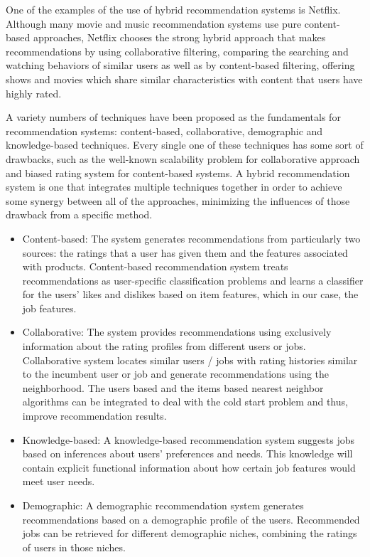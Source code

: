 \documentclass[sigconf]{acmart}
\begin{document}
\par One of the examples of the use of hybrid recommendation systems is Netflix. Although many movie and music recommendation systems use pure content-based approaches, Netflix chooses the strong hybrid approach that makes recommendations by using collaborative filtering, comparing the searching and watching behaviors of similar users as well as by content-based filtering, offering shows and movies which share similar characteristics with content that users have highly rated.

\par A variety numbers of techniques have been proposed as the fundamentals for recommendation systems: content-based, collaborative, demographic and knowledge-based techniques. Every single one of these techniques has some sort of drawbacks, such as the well-known scalability problem for collaborative approach and biased rating system for content-based systems. A hybrid recommendation system is one that integrates multiple techniques together in order to achieve some synergy between all of the approaches, minimizing the influences of those drawback from a specific method.

\begin{itemize}
  \item Content-based: The system generates recommendations from particularly two sources: the ratings that a user has given them and the features associated with products. Content-based recommendation system treats recommendations as user-specific classification problems and learns a classifier for the users' likes and dislikes based on item features, which in our case, the job features.
  \item Collaborative: The system provides recommendations using exclusively information about the rating profiles from different users or jobs. Collaborative system locates similar users / jobs with rating histories similar to the incumbent user or job and generate recommendations using the neighborhood. The users based and the items based nearest neighbor algorithms can be integrated to deal with the cold start problem and thus, improve recommendation results.
  \item Knowledge-based: A knowledge-based recommendation system suggests jobs based on inferences about users' preferences and needs. This knowledge will contain explicit functional information about how certain job features would meet user needs.
  \item Demographic: A demographic recommendation system generates recommendations based on a demographic profile of the users. Recommended jobs can be retrieved for different demographic niches, combining the ratings of users in those niches.
\end{itemize}
\end{document}
